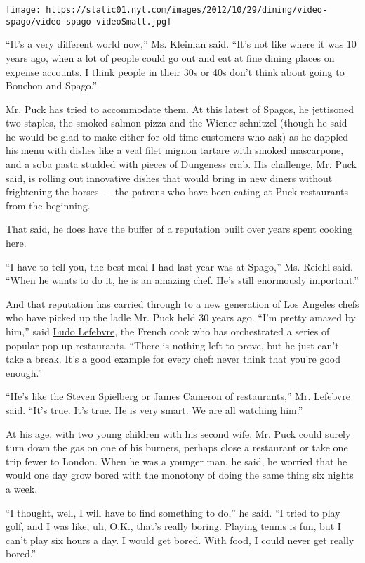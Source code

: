 \texttt{[image: https://static01.nyt.com/images/2012/10/29/dining/video-spago/video-spago-videoSmall.jpg]}

``It's a very different world now,'' Ms. Kleiman said. ``It's not like
where it was 10 years ago, when a lot of people could go out and eat at
fine dining places on expense accounts. I think people in their 30s or
40s don't think about going to Bouchon and Spago.''

Mr. Puck has tried to accommodate them. At this latest of Spagos, he
jettisoned two staples, the smoked salmon pizza and the Wiener schnitzel
(though he said he would be glad to make either for old-time customers
who ask) as he dappled his menu with dishes like a veal filet mignon
tartare with smoked mascarpone, and a soba pasta studded with pieces of
Dungeness crab. His challenge, Mr. Puck said, is rolling out innovative
dishes that would bring in new diners without frightening the horses ---
the patrons who have been eating at Puck restaurants from the beginning.

That said, he does have the buffer of a reputation built over years
spent cooking here.

``I have to tell you, the best meal I had last year was at Spago,'' Ms.
Reichl said. ``When he wants to do it, he is an amazing chef. He's still
enormously important.''

And that reputation has carried through to a new generation of Los
Angeles chefs who have picked up the ladle Mr. Puck held 30 years ago.
``I'm pretty amazed by him,'' said
\href{http://www.nytimes.com/2010/08/04/dining/04notebook.html?pagewanted=all}{Ludo
Lefebvre}, the French cook who has orchestrated a series of popular
pop-up restaurants. ``There is nothing left to prove, but he just can't
take a break. It's a good example for every chef: never think that
you're good enough.''

``He's like the Steven Spielberg or James Cameron of restaurants,'' Mr.
Lefebvre said. ``It's true. It's true. He is very smart. We are all
watching him.''

At his age, with two young children with his second wife, Mr. Puck could
surely turn down the gas on one of his burners, perhaps close a
restaurant or take one trip fewer to London. When he was a younger man,
he said, he worried that he would one day grow bored with the monotony
of doing the same thing six nights a week.

``I thought, well, I will have to find something to do,'' he said. ``I
tried to play golf, and I was like, uh, O.K., that's really boring.
Playing tennis is fun, but I can't play six hours a day. I would get
bored. With food, I could never get really bored.''

